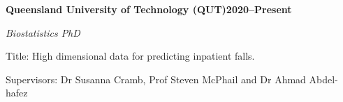 \textbf{Queensland University of Technology (QUT)\hfill 2020--Present} \par
\textit{Biostatistics PhD} \par
Title: High dimensional data for predicting inpatient falls.\par
Supervisors: Dr Susanna Cramb, Prof Steven McPhail and Dr Ahmad Abdel-hafez\par